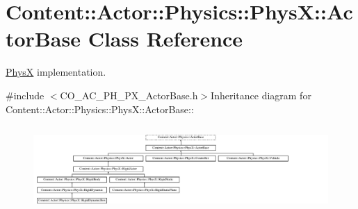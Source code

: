 \hypertarget{classContent_1_1Actor_1_1Physics_1_1PhysX_1_1ActorBase}{
\section{Content::Actor::Physics::PhysX::ActorBase Class Reference}
\label{classContent_1_1Actor_1_1Physics_1_1PhysX_1_1ActorBase}
}


\hyperlink{namespaceContent_1_1Actor_1_1Physics_1_1PhysX}{PhysX} implementation.  


{\ttfamily \#include $<$CO\_\-AC\_\-PH\_\-PX\_\-ActorBase.h$>$}Inheritance diagram for Content::Actor::Physics::PhysX::ActorBase::\begin{figure}[H]
\begin{center}
\leavevmode
\includegraphics[height=3.29966cm]{classContent_1_1Actor_1_1Physics_1_1PhysX_1_1ActorBase}
\end{center}
\end{figure}
